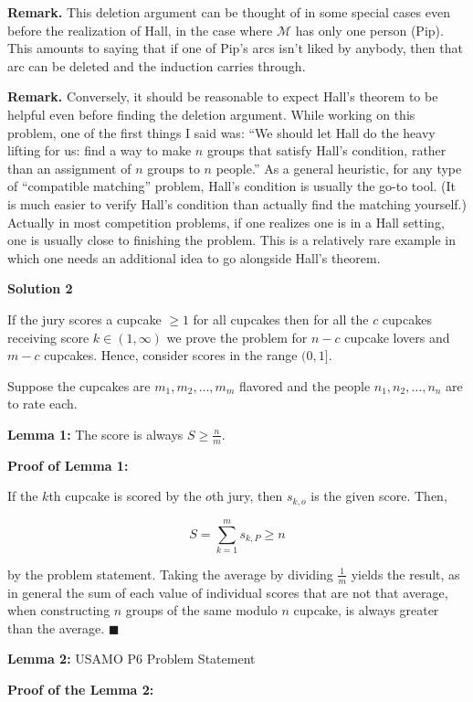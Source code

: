 \begin{enumerate}
 \textbf{Remark.} This deletion argument can be thought of in some special cases even before the realization of Hall, in the case where $\mathcal{M}$ has only one person (Pip). This amounts to saying that if one of Pip’s arcs isn’t liked by anybody, then that arc can be deleted and the induction carries through.

 \textbf{Remark.} Conversely, it should be reasonable to expect Hall’s theorem to be helpful even before finding the deletion argument. While working on this problem, one of the first things I said was: “We should let Hall do the heavy lifting for us: find a way to make $n$ groups that satisfy Hall’s condition, rather than an assignment of $n$ groups to $n$ people.” As a general heuristic, for any type of “compatible matching” problem, Hall’s condition is usually the go-to tool. (It is much easier to verify Hall’s condition than actually find the matching yourself.) Actually in most competition problems, if one realizes one is in a Hall setting, one is usually close to finishing the problem. This is a relatively rare example in which one needs an additional idea to go alongside Hall’s theorem.

 



\textbf{Solution 2}

If the jury scores a cupcake $\geq 1$ for all cupcakes then for all the $c$ cupcakes receiving score $k \in (1, \infty)$ we prove the problem for $n-c$ cupcake lovers and $m-c$ cupcakes. Hence, consider scores in the range $(0,1]$.

 Suppose the cupcakes are $m_1, m_2, \dots, m_m$ flavored and the people $n_1, n_2, \dots, n_n$ are to rate each. 

 \textbf{Lemma 1:} The score is always $S \geq \frac{n}{m}$.

 \textbf{Proof of Lemma 1:}

 If the $k$th cupcake is scored by the $o$th jury, then $s_{k,o}$ is the given score. Then,

 
 \[S=\sum_{k=1}^m s_{k,P} \geq n\]

 by the problem statement. Taking the average by dividing $\frac{1}{m}$ yields the result, as in general the sum of each value of individual scores that are not that average, when constructing $n$ groups of the same modulo $n$ cupcake, is always greater than the average. $\blacksquare$

 \textbf{Lemma 2:} USAMO P6 Problem Statement

 \textbf{Proof of the Lemma 2:}


\end{enumerate}
